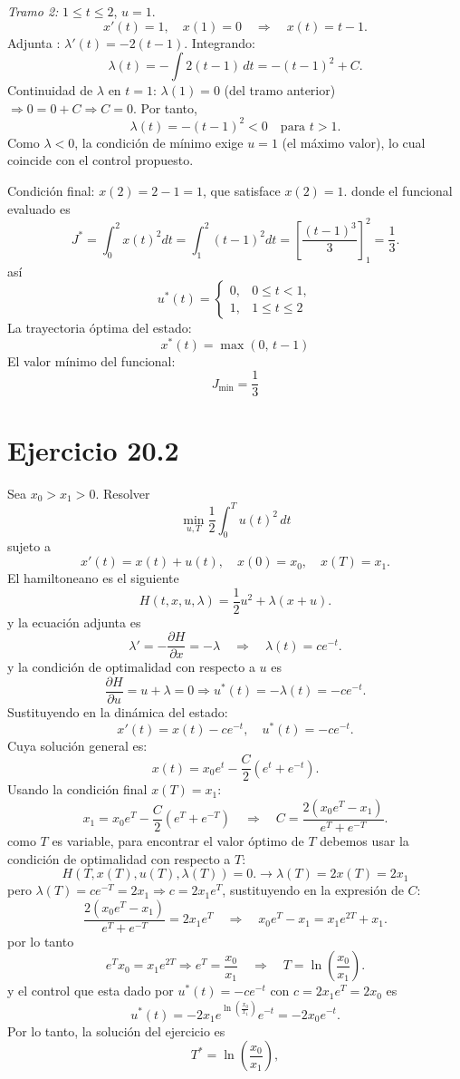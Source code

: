 \documentclass{uofa-eng-assignment}
\begin{document}
\textit{Tramo 2:} $1 \le t \le 2$, $u=1$.
\[
x'(t)=1, \quad x(1)=0 \quad \Rightarrow \quad x(t)=t-1.
\]
Adjunta : $\lambda'(t) = -2(t-1)$. Integrando:
\[
\lambda(t) = -\int 2(t-1)\,dt = -(t-1)^2 + C.
\]
Continuidad de $\lambda$ en $t=1$: $\lambda(1)=0$ (del tramo anterior) $\Rightarrow 0 = 0 + C \Rightarrow C=0$. Por tanto,
\[
\lambda(t) = -(t-1)^2 < 0 \quad \text{para } t>1.
\]
Como $\lambda<0$, la condición de mínimo exige $u=1$ (el máximo valor), lo cual coincide con el control propuesto.

Condición final: $x(2)=2-1=1$, que satisface $x(2)=1$. donde el funcional evaluado es
\[
J^* = \int_0^2 x(t)^2 dt = \int_1^2 (t-1)^2 dt = \left[ \frac{(t-1)^3}{3} \right]_{1}^{2} = \frac{1}{3}.
\]
así
\[
u^*(t) = \begin{cases}
0, & 0 \le t < 1,\\
1, & 1 \le t \le 2
\end{cases}
\]
La trayectoria óptima del estado:
\[
x^*(t) = \max(0,\, t-1)
\]
El valor mínimo del funcional:
\[
J_{\min} = \frac{1}{3}
\]
\section*{Ejercicio 20.2}
Sea $x_0 > x_1 > 0$. Resolver
\[
\min_{u, T} \frac{1}{2} \int_0^T u(t)^2 \, dt
\]
sujeto a
\[
x'(t) = x(t) + u(t), \quad x(0) = x_0, \quad x(T) = x_1.
\]
El hamiltoneano es el siguiente 
\[
H(t,x,u,\lambda) = \frac{1}{2} u^2 + \lambda (x+u).
\]
y la ecuación adjunta es
\[
\lambda' = -\frac{\partial H}{\partial x} = -\lambda \quad \Rightarrow \quad \lambda(t) = ce^{-t}.
\]
y la condición de optimalidad con respecto a $u$ es
\[
\frac{\partial H}{\partial u} = u + \lambda = 0 \Rightarrow u^*(t) = -\lambda(t) = -ce^{-t}.
\]
Sustituyendo en la dinámica del estado:
\[
x'(t) = x(t) - ce^{-t}, \quad u^*(t) = -ce^{-t}.
\]
Cuya solución general es:
\[
x(t) = x_0 e^t - \frac{C}{2} (e^t + e^{-t}).
\]
Usando la condición final $x(T) = x_1$:
\[
x_1 = x_0 e^T - \frac{C}{2} (e^T + e^{-T}) \quad \Rightarrow \quad C = \frac{2(x_0 e^T - x_1)}{e^T + e^{-T}}.
\]
como $T$ es variable, para encontrar el valor óptimo de $T$ debemos usar la condición de optimalidad con respecto a $T$:
\[
H(T, x(T), u(T), \lambda(T)) = 0. \rightarrow \lambda(T)=2x(T)= 2x_1
\]
pero $\lambda(T) = ce^{-T} = 2x_1 \Rightarrow c = 2x_1 e^T$, sustituyendo en la expresión de $C$:
\[
\frac{2(x_0 e^T - x_1)}{e^T + e^{-T}} = 2x_1 e^T \quad \Rightarrow \quad x_0 e^T - x_1 = x_1 e^{2T} + x_1.
\]
por lo tanto
\[
e^Tx_0 = x_1 e^{2T} \Rightarrow e^T = \frac{x_0}{x_1} \quad \Rightarrow \quad T = \ln\left(\frac{x_0}{x_1}\right).
\]
y el control que esta dado por $u^*(t) = -ce^{-t}$ con $c=2x_1 e^T= 2x_0$ es 
\[u^*(t) = -2x_1 e^{\ln\left(\frac{x_0}{x_1}\right)} e^{-t} = -2x_0 e^{-t}.\]
Por lo tanto, la solución del ejercicio es
\[
T^{*}=\ln\!\left(\frac{x_{0}}{x_{1}}\right),
\]
\end{document}
